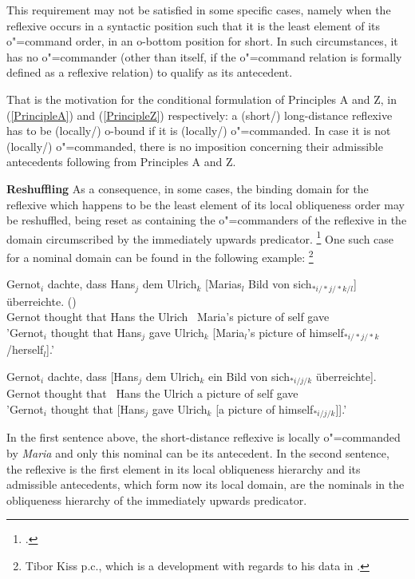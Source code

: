 \documentclass[output=paper
,modfonts
,nonflat]{langsci/langscibook}
\begin{document}
This requirement may not be satisfied in some specific cases, namely
when the reflexive occurs in a syntactic position such that it is the
least element of its \mbox{o"=command} order, in an o-bottom position for short. In such
circumstances, it has no \mbox{o"=commander} (other than itself, if the o"=command relation
is formally defined as a reflexive relation) to qualify as its antecedent.

That is the motivation for the conditional formulation of Principles A and Z, 
in (\ref{PrincipleA}) and (\ref{PrincipleZ}) respectively:
a (short/) long-distance reflexive has to be (locally/) o-bound if it is (locally/) o"=commanded.
In case it is not (locally/) o"=commanded, there is no imposition concerning
their admissible antecedents following from Principles A and Z.


\textbf{Reshuffling} As a consequence, in some cases, the binding domain for the reflexive 
which happens to be the least element of its local obliqueness order may be reshuffled, being reset as 
containing the o"=commanders of the reflexive in the domain 
circumscribed by the immediately upwards predicator.%
\footnote{
\citep{brancoHpsg:2005}.
}
One such case for a nominal domain can be found in the following example:%
%
\footnote{Tibor Kiss p.c., which is a development with regards to his 
data in \citep{kiss:2001}.}


\begin{exe}
\ex
\begin{xlist}
\ex
\gll Gernot$_{i}$ dachte, dass Hans$_{j}$ dem Ulrich$_{k}$ [Marias$_{l}$ Bild von
sich$_{*i/*j/*k/l}$] überreichte. ()\\
Gernot thought that Hans the Ulrich \mbox{ }Maria's picture of self gave\\
\trans 'Gernot$_{i}$ thought that  Hans$_{j}$ gave Ulrich$_{k}$ [Maria$_{l}$'s picture of \linebreak himself$_{*i/*j/*k}$/herself$_{l}$].'
 
\ex
\gll Gernot$_{i}$ dachte, dass [Hans$_{j}$ dem Ulrich$_{k}$ ein Bild von sich$_{*i/j/k}$ überreichte].\\
Gernot thought that \mbox{ }Hans the Ulrich a picture of self gave\\
\trans 'Gernot$_{i}$ thought that  [Hans$_{j}$ gave Ulrich$_{k}$ [a picture of \linebreak himself$_{*i/j/k}$]].'
\end{xlist}
\end{exe}

In the first sentence above, the short-distance reflexive is 
locally \mbox{o"=commanded} by {\em Maria} and only this nominal can be its
antecedent. In the second sentence, the reflexive is the first element
in its local obliqueness hierarchy and its admissible 
antecedents, which form now its local domain, are the nominals in the obliqueness
hierarchy of the immediately upwards predicator.
\end{document}

